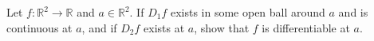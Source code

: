 Let $f:\mathbb R^2\to\mathbb R$ and $a\in\mathbb R^2$. If $D_1 f$ exists in some open ball around $a$ and is continuous at $a$, and if $D_2 f$ exists at $a$, show that $f$ is differentiable at $a$.
